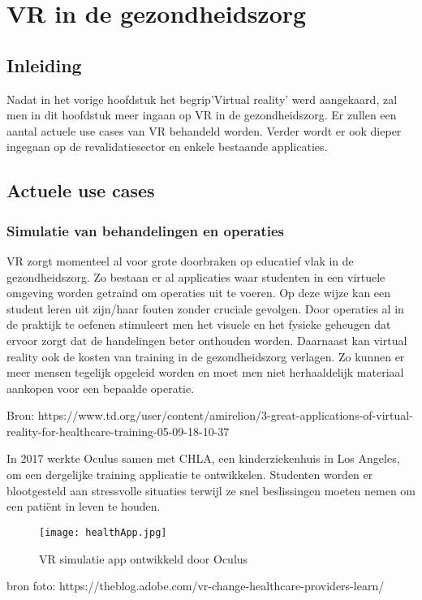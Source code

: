 \chapter{VR in de gezondheidszorg}
\section{Inleiding}
Nadat in het vorige hoofdstuk het begrip'Virtual reality' werd aangekaard, zal men in dit hoofdstuk meer ingaan op VR in de gezondheidszorg. Er zullen een aantal actuele use cases van VR behandeld worden. Verder wordt er ook dieper ingegaan op de revalidatiesector en enkele bestaande applicaties.

\section{Actuele use cases}
\subsection{Simulatie van behandelingen en operaties}
VR zorgt momenteel al voor grote doorbraken op educatief vlak in de gezondheidszorg. Zo bestaan er al applicaties waar studenten in een virtuele omgeving worden getraind om operaties uit te voeren. Op deze wijze kan een student leren uit zijn/haar fouten zonder cruciale gevolgen. Door operaties al in de praktijk te oefenen stimuleert men het visuele en het fysieke geheugen dat ervoor zorgt dat de handelingen beter onthouden worden. Daarnaast kan virtual reality ook de kosten van training in de gezondheidszorg verlagen. Zo kunnen er meer mensen tegelijk opgeleid worden en moet men niet herhaaldelijk materiaal aankopen voor een bepaalde operatie.

Bron: https://www.td.org/user/content/amirelion/3-great-applications-of-virtual-reality-for-healthcare-training-05-09-18-10-37

In 2017 werkte Oculus samen met CHLA, een kinderziekenhuis in Los Angeles, om een dergelijke training applicatie te ontwikkelen. Studenten worden er blootgesteld aan stressvolle situaties terwijl ze snel beslissingen moeten nemen om een patiënt in leven te houden.

\begin{figure}[h]
    \centering
    \texttt{[image: healthApp.jpg]}
    \caption{VR simulatie app ontwikkeld door Oculus}
\end{figure}
bron foto: https://theblog.adobe.com/vr-change-healthcare-providers-learn/

